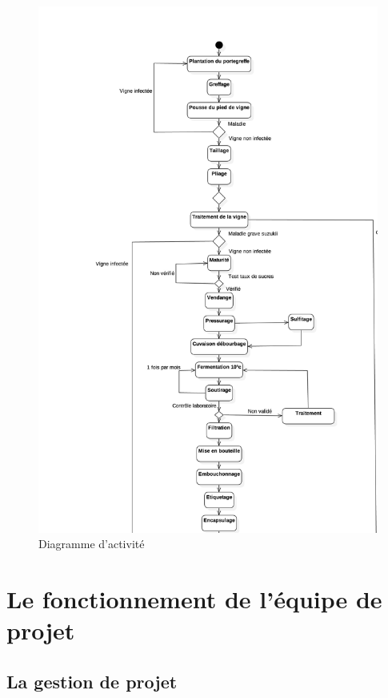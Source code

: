 \documentclass[a4paper, title]{report}
\begin{document}
\begin{figure}
\centering
\includegraphics{Images/DiagrammeActivite.jpg}
\caption{Diagramme d'activité}
\end{figure}

\section{Le fonctionnement de l'équipe de
projet}\label{le-fonctionnement-de-lequipe-de-projet}

\subsection{La gestion de projet}\label{la-gestion-de-projet}
\end{document}
